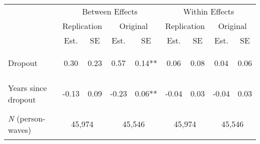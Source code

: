 \begin{center}
\begin{tabular}{lcccccccc}
\hline \noalign{\smallskip} & \multicolumn{4}{c}{Between Effects} & \multicolumn{4}{c}{Within Effects}\\
 & \multicolumn{2}{c}{Replication} & \multicolumn{2}{c}{Original} & \multicolumn{2}{c}{Replication} & \multicolumn{2}{c}{Original}\\
 & Est. & SE & Est. & SE & Est. & SE & Est. & SE\\
\noalign{\smallskip}\hline \noalign{\smallskip}Dropout & \begin{bf}0.30\end{bf} & \begin{bf}0.23\end{bf} & \begin{rm}0.57\end{rm} & \begin{rm}0.14**\end{rm} & \begin{bf}0.06\end{bf} & \begin{bf}0.08\end{bf} & \begin{rm}0.04\end{rm} & \begin{rm}0.06\end{rm}\\
Years since dropout & \begin{bf}-0.13\end{bf} & \begin{bf}0.09\end{bf} & \begin{rm}-0.23\end{rm} & \begin{rm}0.06**\end{rm} & \begin{bf}-0.04\end{bf} & \begin{bf}0.03\end{bf} & \begin{rm}-0.04\end{rm} & \begin{rm}0.03\end{rm}\\
\textit{N} (person-waves) & \multicolumn{2}{c}{\begin{bf}45,974\end{bf}} & \multicolumn{2}{c}{\begin{rm}45,546\end{rm}} & \multicolumn{2}{c}{\begin{bf}45,974\end{bf}} & \multicolumn{2}{c}{\begin{rm}45,546\end{rm}}\\

\end{tabular}
\end{center}
